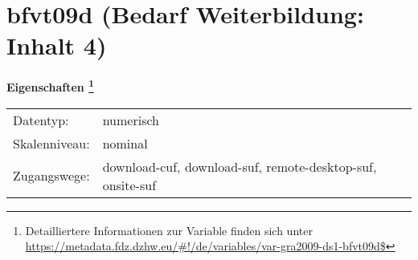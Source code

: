 
    \setcounter{footnote}{0}

    \vspace*{-1.8cm}
	\section{bfvt09d (Bedarf Weiterbildung: Inhalt 4)}
	\label{section:bfvt09d}



    \vspace*{0.5cm}
    \noindent\textbf{Eigenschaften
	\footnote{Detailliertere Informationen zur Variable finden sich unter
		\url{https://metadata.fdz.dzhw.eu/\#!/de/variables/var-gra2009-ds1-bfvt09d$}}}\\
	\begin{tabularx}{\hsize}{@{}lX}
	Datentyp: & numerisch \\
	Skalenniveau: & nominal \\
	Zugangswege: &
	  download-cuf, 
	  download-suf, 
	  remote-desktop-suf, 
	  onsite-suf
 \\
    \end{tabularx}



